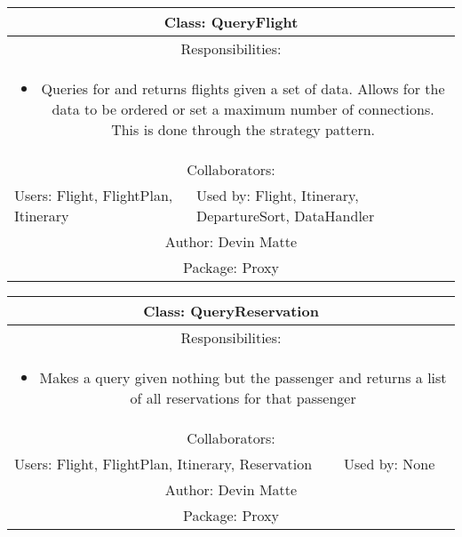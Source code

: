\begin{center}
    \begin{tabular}{ |p{7cm}|p{7cm}|  }
        \hline
        \multicolumn{2}{|c|}{Class: QueryFlight} \\
        \hline
        \multicolumn{2}{|c|}{Responsibilities:} \\ \multicolumn{2}{|c|}{\parbox{0.9\textwidth}{
        \begin{itemize}
            \item Queries for and returns flights given a set of data.
            Allows for the data to be ordered or set a maximum number of connections. This is done through the strategy pattern.
        \end{itemize} }} \\
        \hline
        \multicolumn{2}{|c|}{Collaborators:} \\
        \hline
        Users: Flight, FlightPlan, Itinerary & Used by: Flight, Itinerary, DepartureSort, DataHandler \\
        \hline
        \multicolumn{2}{|c|}{Author: Devin Matte} \\
        \hline
        \multicolumn{2}{|c|}{Package: Proxy} \\
        \hline
    \end{tabular}
\end{center}

\begin{center}
    \begin{tabular}{ |p{7cm}|p{7cm}|  }
        \hline
        \multicolumn{2}{|c|}{Class: QueryReservation} \\
        \hline
        \multicolumn{2}{|c|}{Responsibilities:} \\ \multicolumn{2}{|c|}{\parbox{0.9\textwidth}{
        \begin{itemize}
            \item Makes a query given nothing but the passenger and returns a list of all reservations for that passenger
        \end{itemize} }} \\
        \hline
        \multicolumn{2}{|c|}{Collaborators:} \\
        \hline
        Users: Flight, FlightPlan, Itinerary, Reservation & Used by: None \\
        \hline
        \multicolumn{2}{|c|}{Author: Devin Matte} \\
        \hline
        \multicolumn{2}{|c|}{Package: Proxy} \\
        \hline
    \end{tabular}
\end{center}

